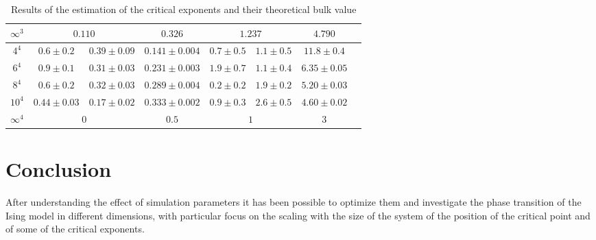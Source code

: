 \documentclass[a4paper, 11pt]{article}
\begin{document}
\begin{table}
\begin{tabular}{c|ccccccc}
          $\infty^3$ & \multicolumn{2}{c}{$0.110$} & $0.326$ & \multicolumn{2}{c}{$1.237$} & $4.790$\\
          \midrule
          $4^4$ & $0.6 \pm 0.2$ & $0.39 \pm 0.09$ & $0.141 \pm 0.004$ & $0.7 \pm 0.5$ & $1.1 \pm 0.5$ & $11.8 \pm 0.4$\\
          $6^4$ & $0.9 \pm 0.1$ & $0.31 \pm 0.03$ & $0.231 \pm 0.003$ & $1.9 \pm 0.7$ & $1.1 \pm 0.4$ & $6.35 \pm 0.05$\\
          $8^4$ & $0.6 \pm 0.2$ & $0.32 \pm 0.03$ & $0.289 \pm 0.004$ & $0.2 \pm 0.2$ & $1.9 \pm 0.2$ & $5.20 \pm 0.03$\\
          $10^4$ & $0.44 \pm 0.03$ & $0.17 \pm 0.02$ & $0.333 \pm 0.002$ & $0.9 \pm 0.3$ & $2.6 \pm 0.5$ & $4.60 \pm 0.02$\\
          $\infty^4$ & \multicolumn{2}{c}{$0$} & $0.5$ & \multicolumn{2}{c}{$1$} & $3$\\
          \bottomrule
        \end{tabular}
        \caption{Results of the estimation of the critical exponents and their theoretical bulk value}
        \label{tab:exponents}
      \end{table}


  \section{Conclusion}
    After understanding the effect of simulation parameters it has been possible to optimize them and investigate the phase transition of the Ising model in different dimensions, with particular focus on the scaling with the size of the system of the position of the critical point and of some of the critical exponents.
\end{document}
